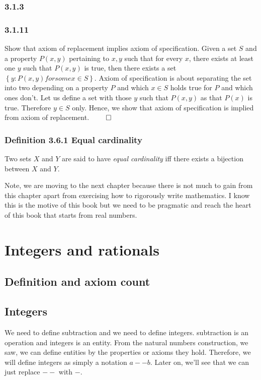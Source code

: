 \documentclass{report}
\begin{document}
\subsection*{3.1.3}


\subsection*{3.1.11}
Show that axiom of replacement implies axiom of specification. Given a set $S$ and a property  $P(x,y)$ pertaining to  $x,y$ such that for every  $x$, there exists at least one $y$ such that $P(x,y)$ is true, then there exists a set $\left\{ y: P(x,y) for some x \in S \right\} $. Axiom of specification is about separating the set into two depending on a property $P$ and which $x \in S$ holds true for $P$ and which ones don't. Let us define a set with those $y$ such that $P(x, y)$ as  that $P(x)$ is true. Therefore  $y \in S$ only. Hence, we show that axiom of specification is implied from axiom of replacement.  $\qed$





\subsection*{Definition 3.6.1 Equal cardinality} Two sets $X$ and  $Y$ are said to have  \textit{equal cardinality} iff there exists a bijection between  $X$ and  $Y$.

Note, we are moving to the next chapter because there is not much to gain from this chapter apart from exercising how to rigorously write mathematics. I know this is the motive of this book but we need to be pragmatic and reach the heart of this book that starts from real numbers. 

\chapter{Integers and rationals}
\section*{Definition and axiom count}

\section{Integers}
We need to define subtraction and we need to define integers. subtraction is an operation and integers is an entity. From the natural numbers construction, we saw, we can define entities by the properties or axioms they hold. Therefore, we will define integers as simply a notation $a--b$. Later on, we'll see that we can just replace $--$ with  $-$.
\end{document}
